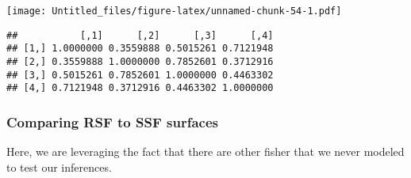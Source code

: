 \documentclass[
]{article}
\newenvironment{Shaded}{\begin{snugshade}}{\end{snugshade}}
\newcommand{\AttributeTok}[1]{\textcolor[rgb]{0.77,0.63,0.00}{#1}}
\newcommand{\DecValTok}[1]{\textcolor[rgb]{0.00,0.00,0.81}{#1}}
\newcommand{\FunctionTok}[1]{\textcolor[rgb]{0.00,0.00,0.00}{#1}}
\newcommand{\NormalTok}[1]{#1}
\newcommand{\SpecialCharTok}[1]{\textcolor[rgb]{0.00,0.00,0.00}{#1}}
\newcommand{\StringTok}[1]{\textcolor[rgb]{0.31,0.60,0.02}{#1}}
\begin{document}
\texttt{[image: Untitled\_files/figure-latex/unnamed-chunk-54-1.pdf]}

\begin{Shaded}
\end{Shaded}

\begin{verbatim}
##           [,1]      [,2]      [,3]      [,4]
## [1,] 1.0000000 0.3559888 0.5015261 0.7121948
## [2,] 0.3559888 1.0000000 0.7852601 0.3712916
## [3,] 0.5015261 0.7852601 1.0000000 0.4463302
## [4,] 0.7121948 0.3712916 0.4463302 1.0000000
\end{verbatim}

\hypertarget{comparing-rsf-to-ssf-surfaces-2}{%
\subsubsection{Comparing RSF to SSF
surfaces}\label{comparing-rsf-to-ssf-surfaces-2}}

Here, we are leveraging the fact that there are other fisher that we
never modeled to test our inferences.
\end{document}
